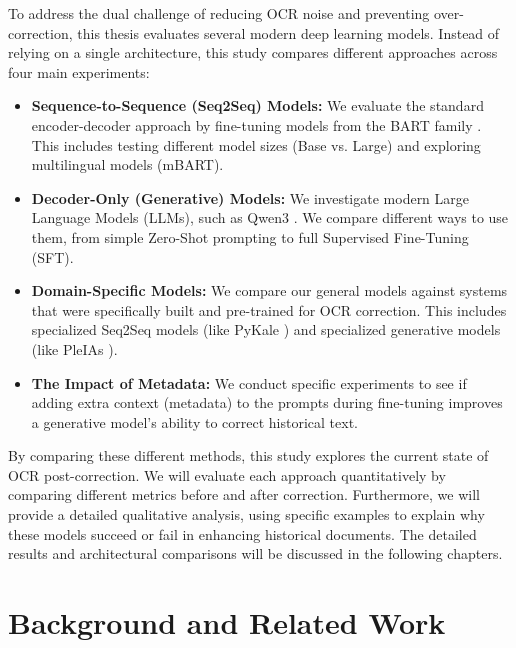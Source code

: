 \documentclass[11pt]{extarticle}
\begin{document}
To address the dual challenge of reducing OCR noise and preventing over-correction, this thesis evaluates several modern deep learning models. Instead of relying on a single architecture, this study compares different approaches across four main experiments:

\begin{itemize}
    \item \textbf{Sequence-to-Sequence (Seq2Seq) Models:} We evaluate the standard encoder-decoder approach by fine-tuning models from the BART family \cite{lewis2019bartdenoisingsequencetosequencepretraining}. This includes testing different model sizes (Base vs. Large) and exploring multilingual models (mBART).
    
    \item \textbf{Decoder-Only (Generative) Models:} We investigate modern Large Language Models (LLMs), such as Qwen3 \cite{yang2025qwen3technicalreport}. We compare different ways to use them, from simple Zero-Shot prompting to full Supervised Fine-Tuning (SFT).
    
    \item \textbf{Domain-Specific Models:} We compare our general models against systems that were specifically built and pre-trained for OCR correction. This includes specialized Seq2Seq models (like PyKale \cite{thomas-etal-2024-leveraging}) and specialized generative models (like PleIAs \cite{pleIAs}).
    
    \item \textbf{The Impact of Metadata:} We conduct specific experiments to see if adding extra context (metadata) to the prompts during fine-tuning improves a generative model's ability to correct historical text.
\end{itemize}

By comparing these different methods, this study explores the current state of OCR post-correction. We will evaluate each approach quantitatively by comparing different metrics before and after correction. Furthermore, we will provide a detailed qualitative analysis, using specific examples to explain why these models succeed or fail in enhancing historical documents. The detailed results and architectural comparisons will be discussed in the following chapters.

\section{Background and Related Work}
\end{document}
